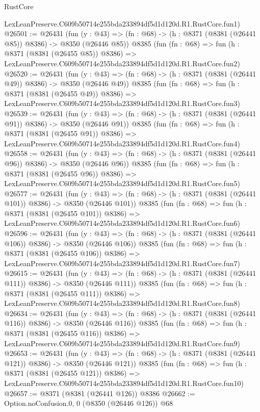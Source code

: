 \begin{lexlean}{RustCore}
\begin{coremodule}
    LexLeanPreserve.C609b50714e255bda233894df5d1d120d.R1.RustCore.fun1)
@26501 := @26431
    (fun (y : @43) => (fn : @68) -> (h : @8371 (@8381 (@26441 @85)) @8386) -> @8350 (@26446 @85))
    @8385
    (fun (fn : @68) =>
    fun (h : @8371 (@8381 (@26455 @85)) @8386) =>
    LexLeanPreserve.C609b50714e255bda233894df5d1d120d.R1.RustCore.fun2)
@26520 := @26431
    (fun (y : @43) => (fn : @68) -> (h : @8371 (@8381 (@26441 @49)) @8386) -> @8350 (@26446 @49))
    @8385
    (fun (fn : @68) =>
    fun (h : @8371 (@8381 (@26455 @49)) @8386) =>
    LexLeanPreserve.C609b50714e255bda233894df5d1d120d.R1.RustCore.fun3)
@26539 := @26431
    (fun (y : @43) => (fn : @68) -> (h : @8371 (@8381 (@26441 @91)) @8386) -> @8350 (@26446 @91))
    @8385
    (fun (fn : @68) =>
    fun (h : @8371 (@8381 (@26455 @91)) @8386) =>
    LexLeanPreserve.C609b50714e255bda233894df5d1d120d.R1.RustCore.fun4)
@26558 := @26431
    (fun (y : @43) => (fn : @68) -> (h : @8371 (@8381 (@26441 @96)) @8386) -> @8350 (@26446 @96))
    @8385
    (fun (fn : @68) =>
    fun (h : @8371 (@8381 (@26455 @96)) @8386) =>
    LexLeanPreserve.C609b50714e255bda233894df5d1d120d.R1.RustCore.fun5)
@26577 := @26431
    (fun (y : @43) => (fn : @68) -> (h : @8371 (@8381 (@26441 @101)) @8386) -> @8350 (@26446 @101))
    @8385
    (fun (fn : @68) =>
    fun (h : @8371 (@8381 (@26455 @101)) @8386) =>
    LexLeanPreserve.C609b50714e255bda233894df5d1d120d.R1.RustCore.fun6)
@26596 := @26431
    (fun (y : @43) => (fn : @68) -> (h : @8371 (@8381 (@26441 @106)) @8386) -> @8350 (@26446 @106))
    @8385
    (fun (fn : @68) =>
    fun (h : @8371 (@8381 (@26455 @106)) @8386) =>
    LexLeanPreserve.C609b50714e255bda233894df5d1d120d.R1.RustCore.fun7)
@26615 := @26431
    (fun (y : @43) => (fn : @68) -> (h : @8371 (@8381 (@26441 @111)) @8386) -> @8350 (@26446 @111))
    @8385
    (fun (fn : @68) =>
    fun (h : @8371 (@8381 (@26455 @111)) @8386) =>
    LexLeanPreserve.C609b50714e255bda233894df5d1d120d.R1.RustCore.fun8)
@26634 := @26431
    (fun (y : @43) => (fn : @68) -> (h : @8371 (@8381 (@26441 @116)) @8386) -> @8350 (@26446 @116))
    @8385
    (fun (fn : @68) =>
    fun (h : @8371 (@8381 (@26455 @116)) @8386) =>
    LexLeanPreserve.C609b50714e255bda233894df5d1d120d.R1.RustCore.fun9)
@26653 := @26431
    (fun (y : @43) => (fn : @68) -> (h : @8371 (@8381 (@26441 @121)) @8386) -> @8350 (@26446 @121))
    @8385
    (fun (fn : @68) =>
    fun (h : @8371 (@8381 (@26455 @121)) @8386) =>
    LexLeanPreserve.C609b50714e255bda233894df5d1d120d.R1.RustCore.fun10)
@26657 := @8371 (@8381 (@26441 @126)) @8386
@26662 := Option.noConfusion.{0, 0} (@8350 (@26446 @126)) @68

\end{coremodule}
\end{lexlean}
